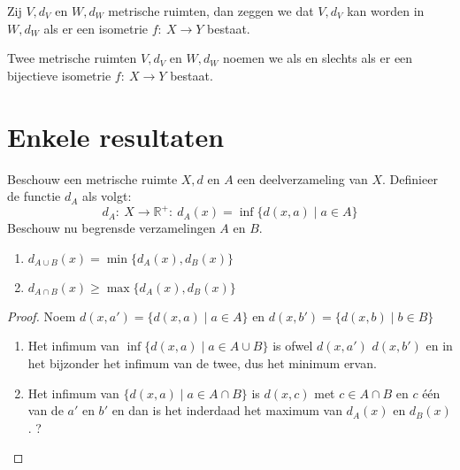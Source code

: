 \documentclass[main.tex]{subfiles}
\begin{document}
\begin{de}
  Zij $V,d_{V}$ en $W,d_{W}$ metrische ruimten, dan zeggen we dat $V,d_{V}$  kan worden in $W,d_{W}$ als er een isometrie $f:\ X \rightarrow Y$ bestaat.
\end{de}

\begin{de}
  Twee metrische ruimten $V,d_{V}$ en $W,d_{W}$ noemen we  als en slechts als er een bijectieve isometrie $f:\ X \rightarrow Y$ bestaat.
\end{de}




\section{Enkele resultaten}
\label{sec:enkele-resultaten}

\begin{st}
  Beschouw een metrische ruimte $X,d$ en $A$ een deelverzameling van $X$.
  Definieer de functie $d_{A}$ als volgt:
  \[ d_{A}:\ X \rightarrow \mathbb{R}^{+}:\ d_{A}(x) = \inf\{d(x,a) \mid a\in A\} \]
  Beschouw nu begrensde verzamelingen $A$ en $B$.
  \begin{enumerate}
  \item $d_{A\cup B}(x) = \min\{d_{A}(x),d_{B}(x)\}$
  \item $d_{A\cap B}(x) \ge \max\{d_{A}(x),d_{B}(x)\}$
  \end{enumerate}

  \begin{proof}
    \noindent
    Noem $d(x,a') = \{d(x,a) \mid a\in A\}$ en $d(x,b') = \{d(x,b) \mid b\in B\}$
    \begin{enumerate}
    \item Het infimum van $\inf\{d(x,a) \mid a\in A\cup B\}$ is ofwel $d(x,a')$ $d(x,b')$ en in het bijzonder het infimum van de twee, dus het minimum ervan.
    \item Het infimum van $\{d(x,a) \mid a\in A\cap B\}$ is $d(x,c)$ met $c\in A\cap B$ en $c$ \'e\'en van de $a'$ en $b'$ en dan is het inderdaad het maximum van $d_{A}(x)$ en $d_{B}(x)$.
      ?
    \end{enumerate}
  \end{proof}
\end{st}
\end{document}
